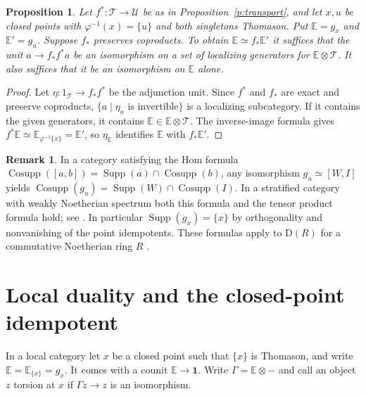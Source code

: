 \documentclass[11pt,reqno]{amsart}
\newtheorem{proposition}[theorem]{Proposition}
\theoremstyle{definition}
\newtheorem{remark}[theorem]{Remark}
\DeclareMathOperator{\Cosupp}{Cosupp}
\DeclareMathOperator{\Supp}{Supp}
\newcommand{\T}{\mathcal T}
\newcommand{\U}{\mathcal U}
\newcommand{\D}{\mathrm D}
\newcommand{\one}{\mathbf 1}
\numberwithin{equation}{section}
\begin{document}
\begin{proposition}\label{p:unit}
Let $f^*:\T\to\U$ be as in Proposition~\ref{p:transport}, and let $x,u$ be closed points with $\varphi^{-1}(x)=\{u\}$ and both singletons Thomason. Put $\mathbb{E}=g_x$ and $\mathbb{E}'=g_u$. Suppose $f_*$ preserves coproducts. To obtain $\mathbb{E}\simeq f_*\mathbb{E}'$ it suffices that the unit $a\to f_*f^*a$ be an isomorphism on a set of localizing generators for $\mathbb{E}\otimes\T$. It also suffices that it be an isomorphism on $\mathbb{E}$ alone.
\end{proposition}
\begin{proof}
Let $\eta:1_{\T}\to f_*f^*$ be the adjunction unit. Since $f^*$ and $f_*$ are exact and preserve coproducts, $\{a\mid\eta_a\text{ is invertible}\}$ is a localizing subcategory. If it contains the given generators, it contains $\mathbb E\in\mathbb E\otimes\T$. The inverse-image formula gives $f^*\mathbb E\simeq\mathbb E_{\varphi^{-1}\{x\}}=\mathbb E'$, so $\eta_{\mathbb E}$ identifies $\mathbb E$ with $f_*\mathbb E'$.
\end{proof}

\begin{remark}\label{r:hom}
In a category satisfying the Hom formula $\Cosupp([a,b])=\Supp(a)\cap\Cosupp(b)$, any isomorphism $g_u\simeq[W,I]$ yields $\Cosupp(g_u)=\Supp(W)\cap\Cosupp(I)$. In a stratified category with weakly Noetherian spectrum both this formula and the tensor product formula hold; see \cite[Theorem~7.15 and Remark~14.23]{bchs}. In particular $\Supp(g_x)=\{x\}$ by orthogonality and nonvanishing of the point idempotents. These formulas apply to $\D(R)$ for a commutative Noetherian ring $R$ \cite[Example~19.2]{bchs}.
\end{remark}

\section{Local duality and the closed-point idempotent}

In a local category let $x$ be a closed point such that $\{x\}$ is Thomason, and write $\mathbb{E}=\mathbb{E}_{\{x\}}=g_x$. It comes with a counit $\mathbb{E}\to\one$. Write $\Gamma=\mathbb{E}\otimes-$ and call an object $z$ torsion at $x$ if $\Gamma z\to z$ is an isomorphism. 
\end{document}

